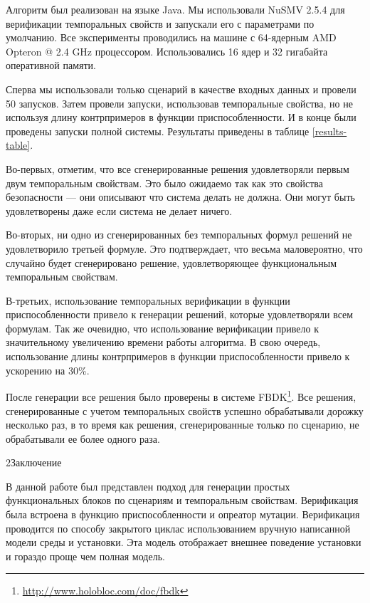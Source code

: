 \documentclass[14pt]{extarticle}
\makeatletter
\theoremstyle{plain}
\theoremstyle{definition}
\renewcommand{\subsection}{\@startsection{subsection}{2}{0mm}%
{2\baselineskip}{\baselineskip}{\bfseries\large\itshape}}
\makeatother
\begin{document}
Алгоритм был реализован на языке Java. Мы использовали NuSMV 2.5.4 для верификации
темпоральных свойств и запускали его с параметрами по умолчанию. Все эксперименты
проводились на машине с 64-ядерным AMD Opteron @ 2.4 GHz процессором.
Использовались 16 ядер и 32 гигабайта оперативной памяти.

Сперва мы использовали только сценарий в качестве входных данных и провели 50 запусков.
Затем провели запуски, использовав темпоральные свойства, но не используя длину
контрпримеров в функции приспособленности. И в конце были проведены запуски полной
системы. Результаты приведены в таблице \ref{results-table}.

Во-первых, отметим, что все сгенерированные решения удовлетворяли первым двум
темпоральным свойствам. Это было ожидаемо так как это свойства безопасности ---
они описывают что система делать не должна. Они могут быть удовлетворены даже
если система не делает ничего.

Во-вторых, ни одно из сгенерированных без темпоральных формул решений не удовлетворило
третьей формуле. Это подтверждает, что весьма маловероятно, что случайно будет
сгенерировано решение, удовлетворяющее функциональным темпоральным свойствам.

В-третьих, использование темпоральных верификации в функции приспособленности привело
к генерации решений, которые удовлетворяли всем формулам. Так же очевидно, что использование
верификации привело к значительному увеличению времени работы алгоритма. В свою очередь,
использование длины контрпримеров в функции приспособленности привело к ускорению на 30\%.

После генерации все решения было проверены в системе FBDK\footnote{\url{http://www.holobloc.com/doc/fbdk}}.
Все решения, сгенерированные с учетом темпоральных свойств успешно обрабатывали дорожку несколько раз,
в то время как решения, сгенерированные только по сценарию, не обрабатывали ее более одного раза.

\subsection{Заключение}

В данной работе был представлен подход для генерации простых функциональных блоков по
сценариям и темпоральным свойствам. Верификация была встроена в функцию приспособленности и
опреатор мутации. Верификация проводится по способу закрытого циклас использованием
вручную написанной модели среды и установки. Эта модель отображает внешнее поведение
установки и гораздо проще чем полная модель.
\end{document}
